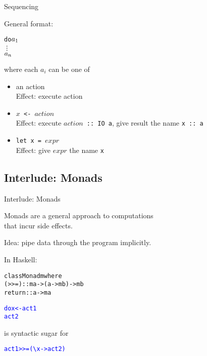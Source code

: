 \documentclass{beamer}
\def\code#1{\texttt{\frenchspacing#1}}
\begin{document}
\begin{frame}[fragile]{Sequencing}

General format:
\begin{alltt}
do \(a\sb1\)
   \vdots
   \(a\sb{n}\)
\end{alltt}

\pause

where each $a_i$ can be one of
\begin{itemize}
    \item an action \\
        Effect: execute action
    \item \code{$x$ <- $action$} \\
        Effect: execute \code{$action$ :: IO a}, give result the name \code{x :: a}
    \item \code{let x = $expr$} \\
        Effect: give \code{$expr$} the name \code{x}
\end{itemize}

\end{frame}

\subsection{Interlude: Monads}

\begin{frame}[fragile]{Interlude: Monads}

\begin{block}{\centering Monads are a general approach to computations \\ that incur side effects.}
\end{block}

\pause

Idea: pipe data through the program implicitly.

\pause

In Haskell:
\begin{alltt}
class Monad m where\pause
  (>>=) :: m a -> (a -> m b) -> m b\pause
  return :: a -> m a
\end{alltt}

\pause

\vspace{0.25cm}
\begin{alltt}
\textcolor{blue}{do x <- act1}
   \textcolor{blue}{act2}
\end{alltt}

is syntactic sugar for

\begin{alltt}
\textcolor{blue}{act1 >>= ({\textbackslash}x -> act2)}
\end{alltt}

\end{frame}
\end{document}
